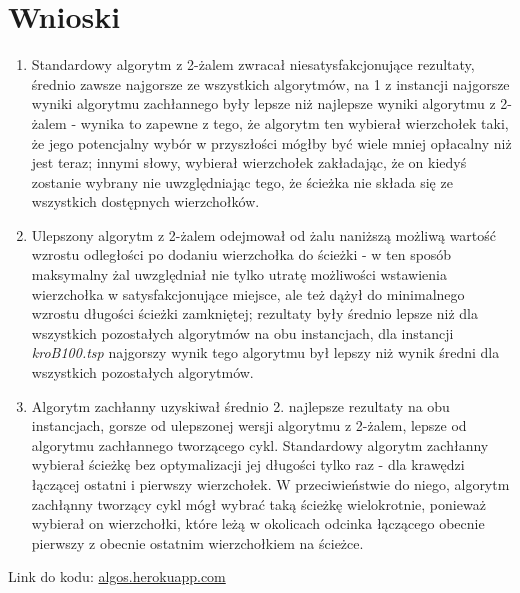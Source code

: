 \documentclass[12pt]{article}
\begin{document}
	\section{Wnioski}
	\begin{enumerate}
		\item Standardowy algorytm z 2-żalem zwracał niesatysfakcjonujące rezultaty, średnio zawsze najgorsze ze wszystkich algorytmów, na 1 z instancji najgorsze wyniki algorytmu zachłannego były lepsze niż najlepsze wyniki algorytmu z 2-żalem - wynika to zapewne z tego, że algorytm ten wybierał wierzchołek taki, że jego potencjalny wybór w przyszłości mógłby być wiele mniej opłacalny niż jest teraz; innymi słowy, wybierał wierzchołek zakładając, że on kiedyś zostanie wybrany nie uwzględniając tego, że ścieżka nie składa się ze wszystkich dostępnych wierzchołków.
		\item Ulepszony algorytm z 2-żalem odejmował od żalu naniższą możliwą wartość wzrostu odległości po dodaniu wierzchołka do ścieżki - w ten sposób maksymalny żal uwzględniał nie tylko utratę możliwości wstawienia wierzchołka w satysfakcjonujące miejsce, ale też dążył do minimalnego wzrostu długości ścieżki zamkniętej; rezultaty były średnio lepsze niż dla wszystkich pozostałych algorytmów na obu instancjach, dla instancji \textit{kroB100.tsp} najgorszy wynik tego algorytmu był lepszy niż wynik średni dla wszystkich pozostałych algorytmów.
		\item Algorytm zachłanny uzyskiwał średnio 2. najlepsze rezultaty na obu instancjach, gorsze od ulepszonej wersji algorytmu z 2-żalem, lepsze od algorytmu zachłannego tworzącego cykl. Standardowy algorytm zachłanny wybierał ścieżkę bez optymalizacji jej długości tylko raz - dla krawędzi łączącej ostatni i pierwszy wierzchołek. W przeciwieństwie do niego, algorytm zachłąnny tworzący cykl mógł wybrać taką ścieżkę wielokrotnie, ponieważ wybierał on wierzchołki, które leżą w okolicach odcinka łączącego obecnie pierwszy z obecnie ostatnim wierzchołkiem na ścieżce.
	\end{enumerate}
	Link do kodu: \color{blue} \href{https://algos.herokuapp.com}{algos.herokuapp.com}\color{black}
	
\end{document}
